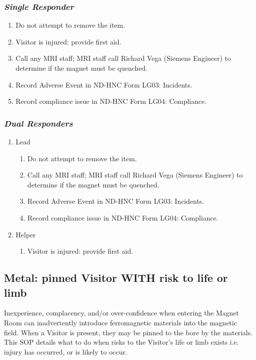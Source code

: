 \documentclass[11pt]{article}
\begin{document}
\subsubsection*{\textit{Single Responder}}

\begin{enumerate}
	\item Do not attempt to remove the item.
	\item Visitor is injured: provide first aid.
	\item Call any MRI staff; MRI staff call Richard Vega (Siemens Engineer) to determine if the magnet must be quenched.
	\item Record Adverse Event in ND-HNC Form LG03: Incidents.
	\item Record compliance issue in ND-HNC Form LG04: Compliance.
\end{enumerate}

\subsubsection*{\textit{Dual Responders}}

\begin{enumerate}
	\item Lead
	\begin{enumerate}
		\item Do not attempt to remove the item.
		\item Call any MRI staff; MRI staff call Richard Vega (Siemens Engineer) to determine if the magnet must be quenched.
		\item Record Adverse Event in ND-HNC Form LG03: Incidents.
		\item Record compliance issue in ND-HNC Form LG04: Compliance.
	\end{enumerate}

	\item Helper
	\begin{enumerate}
		\item Visitor is injured: provide first aid.
	\end{enumerate}
\end{enumerate}


\subsection{Metal: pinned Visitor \textbf{WITH} risk to life or limb}
\label{ssec:metal-risk}

Inexperience, complacency, and/or over-confidence when entering the Magnet Room can inadvertently introduce ferromagnetic materials into the magnetic field. When a Visitor is present, they may be pinned to the bore by the materials. This SOP details what to do when risks to the Visitor's life or limb exists i.e. injury has occurred, or is likely to occur.
\end{document}
